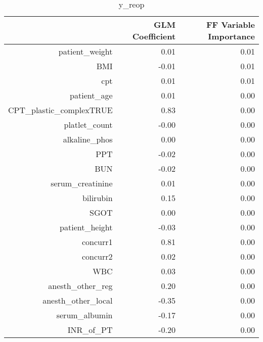 \begin{table}[ht]
\centering
\begin{tabular}{rrr}
  \hline
 & GLM Coefficient & FF Variable Importance \\ 
  \hline
patient\_weight & 0.01 & 0.01 \\ 
  BMI & -0.01 & 0.01 \\ 
  cpt & 0.01 & 0.01 \\ 
  patient\_age & 0.01 & 0.00 \\ 
  CPT\_plastic\_complexTRUE & 0.83 & 0.00 \\ 
  platlet\_count & -0.00 & 0.00 \\ 
  alkaline\_phos & 0.00 & 0.00 \\ 
  PPT & -0.02 & 0.00 \\ 
  BUN & -0.02 & 0.00 \\ 
  serum\_creatinine & 0.01 & 0.00 \\ 
  bilirubin & 0.15 & 0.00 \\ 
  SGOT & 0.00 & 0.00 \\ 
  patient\_height & -0.03 & 0.00 \\ 
  concurr1 & 0.81 & 0.00 \\ 
  concurr2 & 0.02 & 0.00 \\ 
  WBC & 0.03 & 0.00 \\ 
  anesth\_other\_reg & 0.20 & 0.00 \\ 
  anesth\_other\_local & -0.35 & 0.00 \\ 
  serum\_albumin & -0.17 & 0.00 \\ 
  INR\_of\_PT & -0.20 & 0.00 \\ 
   \hline
\end{tabular}
\caption{y_reop} 
\end{table}

